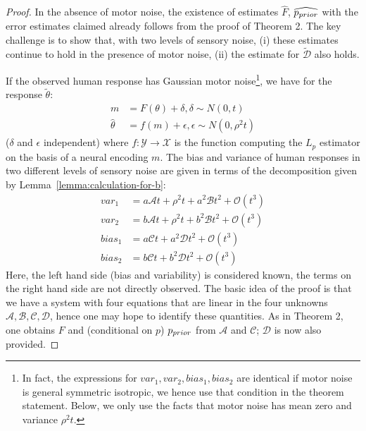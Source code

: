 \begin{proof}
In the absence of motor noise, the existence of estimates $\widehat{F}$, $\widehat{p_{prior}}$ with the error estimates claimed already follows from the proof of Theorem 2. 
    The key challenge is to show that, with two levels of sensory noise, (i) these estimates continue to hold in the presence of motor noise, (ii) the estimate for $\tilde{\mathcal{D}}$ also holds.
    
    If the observed human response has Gaussian motor noise\footnote{In fact, the expressions for $var_1, var_2, bias_1, bias_2$ are identical if motor noise is general symmetric isotropic, we hence use that condition in the theorem statement. Below, we only use the facts that motor noise has mean zero and variance $\rho^2 t$.}, we have for the response $\tilde{\theta}$:
    \begin{align*}
        m &= F(\theta) + \delta, \delta \sim N(0, t)\\
        \widehat{\theta} &= f(m) + \epsilon, \epsilon \sim N(0, \rho^2 t)
    \end{align*}
    ($\delta$ and $\epsilon$ independent) where $f : \mathcal{Y} \rightarrow \mathcal{X}$ is the function computing the $L_p$ estimator on the basis of a neural encoding $m$.
    The bias and variance of human responses in two different levels of sensory noise are given in terms of the decomposition given by Lemma~\ref{lemma:calculation-for-b}:
    \begin{equation}\label{eq:four-expansions}
    \begin{aligned}
        var_1 &= a\mathcal{A}t + \rho^2t + a^2\mathcal{B}t^2 + \mathcal{O}(t^3)\\
        var_2 &= b\mathcal{A}t + \rho^2t + b^2\mathcal{B}t^2 + \mathcal{O}(t^3)\\
        bias_1 &= a\mathcal{C}t + a^2\mathcal{D}t^2 + \mathcal{O}(t^3)\\
        bias_2 &= b\mathcal{C}t + b^2\mathcal{D}t^2 + \mathcal{O}(t^3)
    \end{aligned}
    \end{equation}
    Here, the left hand side (bias and variability) is considered known, the terms on the right hand side are not directly observed.
    The basic idea of the proof is that we have a system with four equations that are linear in the four unknowns $\mathcal{A}, \mathcal{B}, \mathcal{C}, \mathcal{D}$, hence one may hope to identify these quantities. As in Theorem 2, one obtains $F$ and (conditional on $p$) $p_{prior}$ from $\mathcal{A}$ and $\mathcal{C}$; $\mathcal{D}$ is now also provided.



\end{proof}
